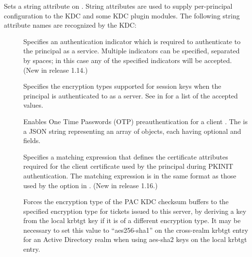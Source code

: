 \documentclass[letterpaper,10pt,english]{sphinxmanual}
\begin{document}
Sets a string attribute on .  String attributes are used to
supply per-principal configuration to the KDC and some KDC plugin
modules.  The following string attribute names are recognized by the
KDC:
\begin{description}
\item[{}] \leavevmode
Specifies an authentication indicator which is required to
authenticate to the principal as a service.  Multiple indicators
can be specified, separated by spaces; in this case any of the
specified indicators will be accepted.  (New in release 1.14.)

\item[{}] \leavevmode
Specifies the encryption types supported for session keys when the
principal is authenticated to as a server.  See
{\hyperref[\detokenize{admin/conf_files/kdc_conf:encryption-types}]{}} in {\hyperref[\detokenize{admin/conf_files/kdc_conf:kdc-conf-5}]{}} for a list of the
accepted values.

\item[{}] \leavevmode
Enables One Time Passwords (OTP) preauthentication for a client
.  The  is a JSON string representing an array
of objects, each having optional  and  fields.

\item[{}] \leavevmode
Specifies a matching expression that defines the certificate
attributes required for the client certificate used by the
principal during PKINIT authentication.  The matching expression
is in the same format as those used by the 
option in {\hyperref[\detokenize{admin/conf_files/krb5_conf:krb5-conf-5}]{}}.  (New in release 1.16.)

\item[{}] \leavevmode
Forces the encryption type of the PAC KDC checksum buffers to the
specified encryption type for tickets issued to this server, by
deriving a key from the local krbtgt key if it is of a different
encryption type.  It may be necessary to set this value to
“aes256-sha1” on the cross-realm krbtgt entry for an Active
Directory realm when using aes-sha2 keys on the local krbtgt
entry.

\end{description}
\end{document}
